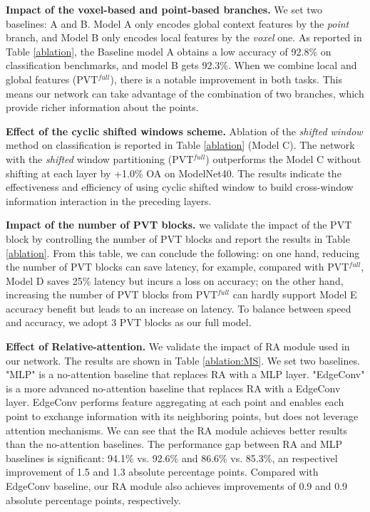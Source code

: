 \documentclass[10pt,twocolumn,letterpaper]{article}
\begin{document}
\textbf{Impact of the voxel-based and point-based branches.} We set two baselines: A and B. Model A only encodes global context features by the \emph{point} branch, and Model B only encodes local features by the \emph{voxel} one. As reported in Table \ref{ablation}, the Baseline model A obtains a low accuracy of 92.8\% on classification benchmarks, and model B gets 92.3\%. When we combine local and global features (PVT$^{full}$), there is a notable improvement in both tasks. This means our network can take advantage of the combination of two branches, which provide richer information about the points.

\textbf{Effect of the cyclic shifted windows scheme.} Ablation of the \emph{shifted window} method on classification is reported in Table \ref{ablation} (Model C). The network with the \emph{shifted} window partitioning (PVT$^{full}$) outperforms the Model C without shifting at each layer by +1.0\% OA on ModelNet40. The results indicate the effectiveness and efficiency of using cyclic shifted window to build cross-window information interaction in the preceding layers.

\textbf{Impact of the number of PVT blocks. } we validate the impact of the PVT block by controlling the number of PVT blocks and report the results in Table \ref{ablation}. From this table, we can conclude the following: on one hand, reducing the number of PVT blocks can save latency, for example, compared with PVT$^{full}$, Model D saves 25\% latency but incurs a loss on accuracy; on the other hand, increasing the number of PVT blocks from PVT$^{full}$ can hardly support Model E accuracy benefit but leads to an increase on latency. To balance between speed and accuracy, we adopt 3 PVT blocks as our full model.

\textbf{Effect of Relative-attention.} We validate the impact of RA module used in our network. The results are shown in Table \ref{ablation:MS}. We set two baselines. "MLP" is a no-attention baseline that replaces RA with a MLP layer. "EdgeConv" is a more advanced no-attention baseline that replaces RA with a EdgeConv layer. EdgeConv performs feature aggregating at each point and enables each point to exchange information with its neighboring points, but does not leverage attention mechanisms. We can see that the RA module achieves better results than the no-attention baselines. The performance gap between RA and MLP baselines is significant: 94.1\% vs. 92.6\% and 86.6\% vs. 85.3\%, an respectivel improvement of 1.5 and 1.3 absolute percentage points. Compared with EdgeConv baseline, our RA module also achieves improvements of 0.9 and 0.9 absolute percentage points, respectively.
\end{document}
